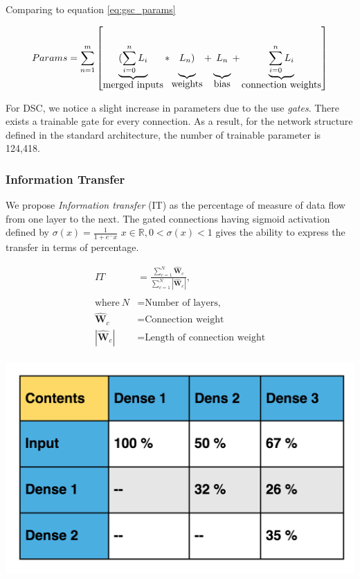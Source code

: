\usepackage{}\documentclass{article}
\let\oldhat\hat
\renewcommand{\hat}[1]{\oldhat{\mathbf{#1}}}
\begin{document}
Comparing to equation \ref{eq:gsc_params} 

\begin{equation}
\label{eq:dsc_params}
Params= \sum_{n=1}^{m}\left[
\underbrace{(\sum_{i=0}^{n}L_{i}\rule[-12pt]{0pt}{5pt}}_{\mbox{merged inputs}}
*\underbrace{L_{n})\rule[-12pt]{0pt}{5pt}}_{\mbox{weights}}
+\underbrace{L_{n}\rule[-12pt]{0pt}{5pt}}_{\mbox{bias}}
+\underbrace{\sum_{i=0}^{n}L_{i}\rule[-12pt]{0pt}{5pt}}_{\mbox{connection weights}}\right]
\end{equation}

For DSC, we notice a slight increase in parameters due to the use \emph{gates}. There exists a trainable gate for every connection. As a result, for the network structure defined in the standard architecture, the number of trainable parameter is 124,418.

\subsubsection{Information Transfer}
We propose \emph{Information transfer} (IT) as the percentage of measure of data flow from one layer to the next. The gated connections having sigmoid activation \cite{Han1995TheIO} defined by $\sigma(x) = \frac{1}{1+e^-x}$ $x\in\mathbb{R}, 0<\sigma(x)<1$  gives the ability to express the transfer in terms of percentage. 

\noindent\begin{minipage}{.45\textwidth}
\begin{align*}
  IT &=\frac{\sum_{c=1}^{N}\hat{W}_{c}}{\sum_{c=1}^{N}|\hat{W}_{c}|}, \\
  \\
  \text{where}~N &= \text{Number of layers,} \\
  \hat{W}_{c} &= \text{Connection weight}\\
  |\hat{W}_{c}| &= \text{Length of connection weight}\\
\end{align*}
\end{minipage}
\begin{minipage}{.45\textwidth}
   \centering
   \includegraphics[scale=0.13]{SampleTable.png}
   \label{fig:DSC.png}
\end{minipage}
\end{document}

